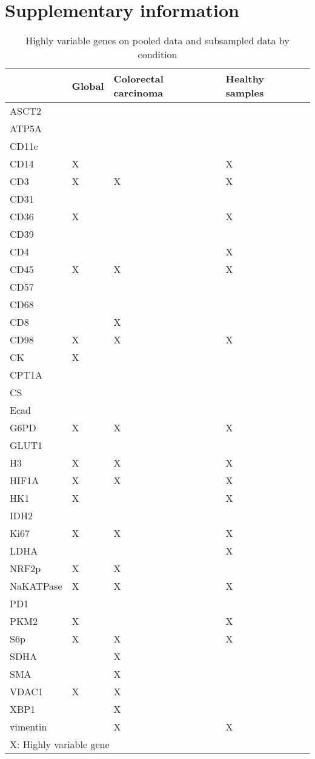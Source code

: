 \chapter{Supplementary information}


\begin{table}[!h]
    \centering
    \caption{Highly variable genes on pooled data and subsampled data by condition}
    \begin{tabular}{llll}
    \hline
        \textbf{} & \textbf{Global} & \textbf{Colorectal carcinoma} & \textbf{Healthy samples} \\ \hline
        ASCT2 & ~ & ~ & ~ \\
        ATP5A & ~ & ~ & ~ \\
        CD11c & ~ & ~ & ~ \\
        CD14 & X & ~ & X \\
        CD3 & X & X & X \\
        CD31 & ~ & ~ & ~ \\
        CD36 & X & ~ & X \\
        CD39 & ~ & ~ & ~ \\
        CD4 & ~ & ~ & X \\
        CD45 & X & X & X \\
        CD57 & ~ & ~ & ~ \\
        CD68 & ~ & ~ & ~ \\
        CD8 & ~ & X & ~ \\
        CD98 & X & X & X \\
        CK & X & ~ & ~ \\
        CPT1A & ~ & ~ & ~ \\
        CS & ~ & ~ & ~ \\
        Ecad & ~ & ~ & ~ \\
        G6PD & X & X & X \\
        GLUT1 & ~ & ~ & ~ \\
        H3 & X & X & X \\
        HIF1A & X & X & X \\
        HK1 & X & ~ & X \\
        IDH2 & ~ & ~ & ~ \\
        Ki67 & X & X & X \\
        LDHA & ~ & ~ & X \\
        NRF2p & X & X & ~ \\
        NaKATPase & X & X & X \\
        PD1 & ~ & ~ & ~ \\
        PKM2 & X & ~ & X \\
        S6p & X & X & X \\
        SDHA & ~ & X & ~ \\
        SMA & ~ & X & ~ \\
        VDAC1 & X & X & ~ \\
        XBP1 & ~ & X & ~ \\
        vimentin & ~ & X & X \\[0.4cm]
        \multicolumn{4}{l}{\scriptsize X: Highly variable gene} \\
    \end{tabular}
    \label{tab:sup-hvargs}
\end{table}


